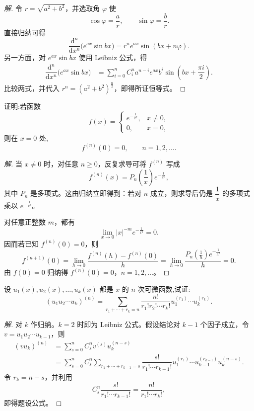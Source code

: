 \documentclass[../../数学分析培优讲义(答案版).tex]{subfiles}
\begin{document}
\begin{proof}[解]
令 $r=\sqrt{a^2+b^2}$，并选取角 $\varphi$ 使
\[
    \cos\varphi=\dfrac{a}{r},
    \qquad
    \sin\varphi=\dfrac{b}{r}.
\]
直接归纳可得
\[
    \dfrac{\mathrm{d}^n}{\mathrm{d}x^n}
    \bigl(e^{ax}\sin bx\bigr)
    =r^n e^{ax}\sin(bx+n\varphi).
\]
另一方面，对 $e^{ax}\sin bx$ 使用 Leibniz 公式，得
\[
\begin{aligned}
    \dfrac{\mathrm{d}^n}{\mathrm{d}x^n}
    \bigl(e^{ax}\sin bx\bigr)
    &=\sum\limits_{i=0}^{n}C_{i}^{n}
    a^{n-i}e^{ax}b^i
    \sin\left(bx+\dfrac{\pi i}{2}\right).
\end{aligned}
\]
比较两式，并代入 $r^n=(a^2+b^2)^{\frac{n}{2}}$，即得所证恒等式。
\end{proof}


\begin{example}[\markstar]
证明:若函数
\[
f(x)=
\begin{cases}
    e^{-\frac{1}{x^2}}, & x\neq0,\\
    0, & x=0,
\end{cases}
\]
则在 $x=0$ 处,
\[
    f^{(n)}(0)=0,
    \qquad n=1,2,\ldots.
\]
\end{example}

\begin{proof}[解]
当 $x\neq0$ 时，对任意 $n\geq0$，反复求导可将 $f^{(n)}$ 写成
\[
    f^{(n)}(x)=P_n\left(\dfrac{1}{x}\right)e^{-\frac{1}{x^2}},
\]
其中 $P_n$ 是多项式。这由归纳立即得到：若对 $n$ 成立，则求导后仍是 $\dfrac{1}{x}$ 的多项式乘以 $e^{-\frac{1}{x^2}}$。

对任意正整数 $m$，都有
\[
    \lim\limits_{x\to0}|x|^{-m}e^{-\frac{1}{x^2}}=0.
\]
因而若已知 $f^{(n)}(0)=0$，则
\[
    f^{(n+1)}(0)
    =\lim\limits_{h\to0}\dfrac{f^{(n)}(h)-f^{(n)}(0)}{h}
    =\lim\limits_{h\to0}
    \dfrac{P_n\left(\frac{1}{h}\right)e^{-\frac{1}{h^2}}}{h}=0.
\]
由 $f(0)=0$ 归纳得 $f^{(n)}(0)=0$，$n=1,2,\ldots$。
\end{proof}

\begin{example}
设 $u_1(x),u_2(x),\ldots,u_k(x)$ 都是 $x$ 的 $n$ 次可微函数,试证:
\[
    (u_1u_2\cdots u_k)^{(n)}
    =\sum\limits_{r_1+\cdots+r_k=n}
    \dfrac{n!}{r_1!r_2!\cdots r_k!}
    u_1^{(r_1)}\cdots u_k^{(r_k)}.
\]
\end{example}

\begin{proof}[解]
对 $k$ 作归纳。$k=2$ 时即为 Leibniz 公式。假设结论对 $k-1$ 个因子成立，令
$v=u_1u_2\cdots u_{k-1}$，则
\[
\begin{aligned}
    (vu_k)^{(n)}
    &=\sum\limits_{s=0}^{n}C_{s}^{n}v^{(s)}u_k^{(n-s)}\\
    &=\sum\limits_{s=0}^{n}C_{s}^{n}
      \sum\limits_{r_1+\cdots+r_{k-1}=s}
      \dfrac{s!}{r_1!\cdots r_{k-1}!}
      u_1^{(r_1)}\cdots u_{k-1}^{(r_{k-1})}u_k^{(n-s)}.
\end{aligned}
\]
令 $r_k=n-s$，并利用
\[
    C_s^n\dfrac{s!}{r_1!\cdots r_{k-1}!}
    =\dfrac{n!}{r_1!\cdots r_k!},
\]
即得题设公式。
\end{proof}
\end{document}
